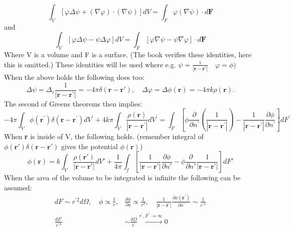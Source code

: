 \begin{equation}
    \int_{V}[\varphi \Delta \psi+(\nabla \varphi) \cdot(\nabla \psi)] d V=\int_{F} \varphi(\nabla \psi) \cdot d \mathbf{F}
\end{equation}
and
\begin{equation}
    \int_{V}[\varphi \Delta \psi-\psi \Delta \varphi] d V=\int_{F}[\varphi \nabla \psi-\psi \nabla \varphi] \cdot d \mathbf{F}
\end{equation}
Where V is a volume and F is a surface. (The book verifies these identities, here this is omitted.) These identities will be used where
e.g. $ \displaystyle \psi = \frac{1}{|\textbf{r}-\textbf{r}'|} \quad \varphi = \phi)$ 
\\
\noindent When the above holds the following does too:
\begin{equation}
    \Delta \psi = \Delta_r \frac{1}{|\textbf{r}-\textbf{r'}|} = -4\pi \delta(\textbf{r}-\textbf{r}'), \quad \Delta \varphi = \Delta \phi(\textbf{r}) = -4\pi k \rho(\textbf{r}).
\end{equation}
The second of Greens theorems then implies:
\begin{equation}
    -4 \pi \int_{V} \phi\left(\mathbf{r}^{\prime}\right) \delta\left(\mathbf{r}-\mathbf{r}^{\prime}\right) d V^{\prime}+4 k \pi \int_{V} \frac{\rho(\mathbf{r})}{\left|\mathbf{r}-\mathbf{r}^{\prime}\right|} d V^{\prime} =\int_{F}\left[\phi \frac{\partial}{\partial n^{\prime}}\left(\frac{1}{\left|\mathbf{r}-\mathbf{r}^{\prime}\right|}\right)-\frac{1}{\left|\mathbf{r}-\mathbf{r}^{\prime}\right|} \frac{\partial \phi}{\partial n^{\prime}}\right] d F^{\prime} 
\end{equation}
When \textbf{r} is inside of V, the following holds. (remember integral of $\phi(\textbf{r}')\delta(\textbf{r}- \textbf{r}')$ gives the potential $\phi(\textbf{r})$)
\begin{equation}
    \phi(\textbf{r}) = k \int_V \frac{\rho(\textbf{r}')}{|\textbf{r}-\textbf{r}'|} dV' + \frac{1}{4\pi}\int_f \left[\frac{1}{|\textbf{r}-\textbf{r'}|}\frac{\partial \phi}{\partial n'}-\phi\frac{\partial}{\partial n'}\frac{1}{|\textbf{r}-\textbf{r'}|} \right] dF'
\end{equation}
When the area of the volume to be integrated is infinite the following can be assumed:
\begin{equation}
    \begin{aligned}
    d F \sim r^{\prime 2} d \Omega, \quad \phi \propto \frac{1}{r}, & \frac{\partial \phi}{\partial \eta} \propto \frac{1}{r^{2}}, \quad \frac{1}{\left|\mathbf{r}-\mathbf{r}^{\prime}\right|} \frac{\partial \phi\left(\mathbf{r}^{\prime}\right)}{\partial n^{\prime}} \sim \frac{1}{r^{\prime 3}} \\
    \frac{d F^{\prime}}{r^{\prime 3}} & \sim \frac{d \Omega}{{r^{\prime}}} \stackrel{r^{\prime}, F^{\prime} \rightarrow \infty}{\longrightarrow} 0
    \end{aligned}
    \label{eq:potential_extended}
\end{equation}
